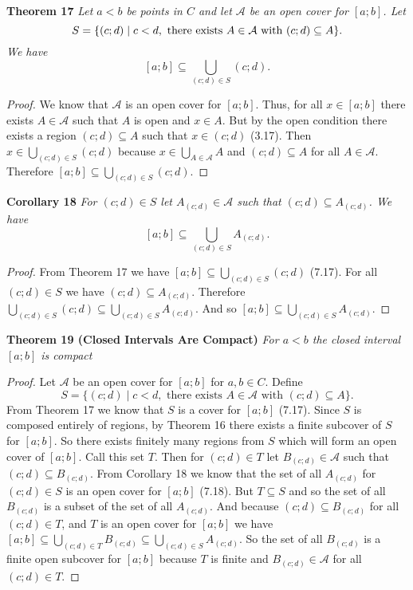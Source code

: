 \documentclass{article}
\begin{document}
\begin{flushleft}
\textbf{Theorem 17}
\textsl{Let $a<b$ be points in $C$ and let $\mathcal{A}$ be an open cover for $[a;b]$. Let
\[
S= \{(c;d) \mid c<d, \textup{ there exists } A \in \mathcal{A} \textup{ with } (c;d) \subseteq A\}.
\]
We have
\[
[a;b] \subseteq \bigcup_{(c;d) \in S} (c;d).
\]}
\begin{proof}
We know that $\mathcal{A}$ is an open cover for $[a;b]$. Thus, for all $x \in [a;b]$ there exists $A \in \mathcal{A}$ such that $A$ is open and $x \in A$. But by the open condition there exists a region $(c;d) \subseteq A$ such that $x \in (c;d)$ (3.17). Then $x \in \bigcup_{(c;d) \in S} (c;d)$ because $x \in \bigcup_{A \in \mathcal{A}} A$ and $(c;d) \subseteq A$ for all $A \in \mathcal{A}$. Therefore $[a;b] \subseteq \bigcup_{(c;d) \in S} (c;d)$.
\end{proof}

\textbf{Corollary 18}
\textsl{For $(c;d) \in S$ let $A_{(c;d)} \in \mathcal{A}$ such that $(c;d) \subseteq A_{(c;d)}$. We have
\[
[a;b] \subseteq \bigcup_{(c;d) \in S} A_{(c;d)}.
\]}
\begin{proof}
From Theorem 17 we have $[a;b] \subseteq \bigcup_{(c;d) \in S} (c;d)$ (7.17). For all $(c;d) \in S$ we have $(c;d) \subseteq A_{(c;d)}$. Therefore $\bigcup_{(c;d) \in S} (c;d) \subseteq \bigcup_{(c;d) \in S} A_{(c;d)}$. And so $[a;b] \subseteq \bigcup_{(c;d) \in S} A_{(c;d)}$.
\end{proof}

\textbf{Theorem 19 (Closed Intervals Are Compact)}
\textsl{For $a<b$ the closed interval $[a;b]$ is compact}
\begin{proof}
Let $\mathcal{A}$ be an open cover for $[a;b]$ for $a,b \in C$. Define
\[
S = \{(c;d) \mid c<d, \text{ there exists } A \in \mathcal{A} \text{ with } (c;d) \subseteq A\}.
\]
From Theorem 17 we know that $S$ is a cover for $[a;b]$ (7.17). Since $S$ is composed entirely of regions, by Theorem 16 there exists a finite subcover of $S$ for $[a;b]$. So there exists finitely many regions from $S$ which will form an open cover of $[a;b]$. Call this set $T$. Then for $(c;d) \in T$ let $B_{(c;d)} \in \mathcal{A}$ such that $(c;d) \subseteq B_{(c;d)}$. From Corollary 18 we know that the set of all $A_{(c;d)}$ for $(c;d) \in S$ is an open cover for $[a;b]$ (7.18). But $T \subseteq S$ and so the set of all $B_{(c;d)}$ is a subset of the set of all $A_{(c;d)}$. And because $(c;d) \subseteq B_{(c;d)}$ for all $(c;d) \in T$, and $T$ is an open cover for $[a;b]$ we have $[a;b] \subseteq \bigcup_{(c;d) \in T} B_{(c;d)} \subseteq \bigcup_{(c;d) \in S} A_{(c;d)}$. So the set of all $B_{(c;d)}$ is a finite open subcover for $[a;b]$ because $T$ is finite and $B_{(c;d)} \in \mathcal{A}$ for all $(c;d) \in T$.
\end{proof}


\end{flushleft}
\end{document}
